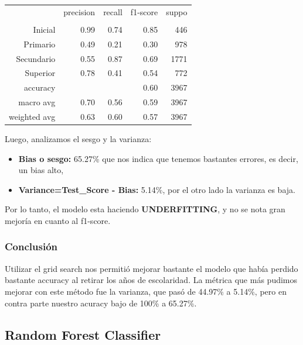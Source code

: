 \documentclass[a4paper]{article}
\begin{document}
            \begin{table}[H]
                \centering
                \begin{tabular}{rrrrr}
                    ~ & precision & recall & f1-score & suppo \\
                    & & & & \\
                    Inicial    & 0.99 & 0.74 & 0.85 & 446 \\
                    Primario   & 0.49 & 0.21 & 0.30 & 978 \\
                    Secundario & 0.55 & 0.87 & 0.69 & 1771 \\
                    Superior   & 0.78 & 0.41 & 0.54 & 772 \\
                    accuracy & & & 0.60 & 3967 \\
                    macro avg & 0.70 & 0.56 & 0.59 & 3967 \\
                    weighted avg & 0.63 & 0.60 & 0.57 & 3967 \\
                \end{tabular}
            \end{table}

            Luego, analizamos el sesgo y la varianza:
            \begin{itemize}
                \item \textbf{Bias o sesgo:} 65.27\% que nos indica que tenemos bastantes errores, es decir, un bias alto,
                \item \textbf{Variance=Test\_Score - Bias:} 5.14\%, por el otro lado la varianza es baja.
            \end{itemize}

            Por lo tanto, el modelo esta haciendo \textbf{UNDERFITTING}, y no se nota gran mejoría en cuanto al f1-score.

            \subsubsection*{Conclusión}

            Utilizar el grid search nos permitió mejorar bastante el modelo que había perdido bastante accuracy al retirar los años de escolaridad. La métrica que más pudimos mejorar con este método fue la varianza, que pasó de 44.97\% a 5.14\%, pero en contra parte nuestro acuracy bajo de 100\% a 65.27\%.

    \subsection{Random Forest Classifier}
        
\end{document}

